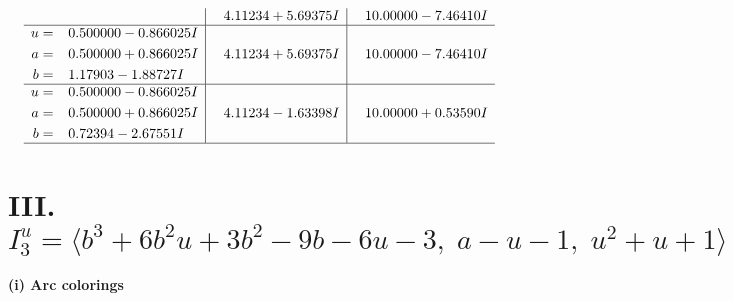 \documentclass[1p]{elsarticle_modified}
\theoremstyle{definition}
\begin{document}
$$\begin{array}{c|c|c}
 & \phantom{-}4.11234 + 5.69375 I & \phantom{-}10.00000 - 7.46410 I \\ \hline\begin{aligned}
u &= \phantom{-}0.500000 - 0.866025 I \\
a &= \phantom{-}0.500000 + 0.866025 I \\
b &= \phantom{-}1.17903 - 1.88727 I\end{aligned}
 & \phantom{-}4.11234 + 5.69375 I & \phantom{-}10.00000 - 7.46410 I \\ \hline\begin{aligned}
u &= \phantom{-}0.500000 - 0.866025 I \\
a &= \phantom{-}0.500000 + 0.866025 I \\
b &= \phantom{-}0.72394 - 2.67551 I\end{aligned}
 & \phantom{-}4.11234 - 1.63398 I & \phantom{-}10.00000 + 0.53590 I\\
 \hline 
 \end{array}$$\newpage\newpage\renewcommand{\arraystretch}{1}
\centering \section*{III. $I^u_{3}= \langle b^3+6 b^2 u+3 b^2-9 b-6 u-3,\;a- u-1,\;u^2+u+1 \rangle$}
\flushleft \textbf{(i) Arc colorings}\\
\end{document}

